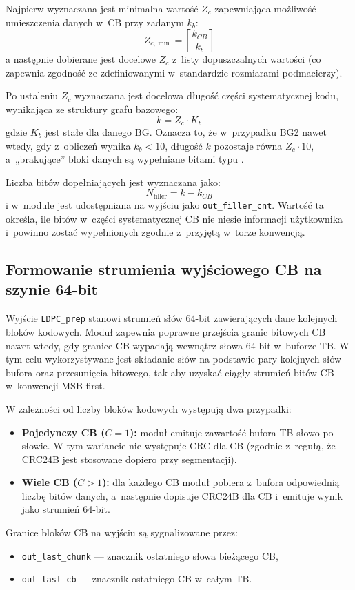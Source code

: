Najpierw wyznaczana jest minimalna wartość $Z_c$ zapewniająca możliwość umieszczenia danych w~CB przy zadanym $k_b$:
\[
Z_{c,\min} = \left\lceil \frac{k_{CB}}{k_b} \right\rceil
\]
a następnie dobierane jest docelowe $Z_c$ z~listy dopuszczalnych wartości (co zapewnia zgodność ze zdefiniowanymi w~standardzie rozmiarami podmacierzy).

Po ustaleniu $Z_c$ wyznaczana jest docelowa długość części systematycznej kodu, wynikająca ze struktury grafu bazowego:
\[
k = Z_c \cdot K_b
\]
gdzie $K_b$ jest stałe dla danego BG. Oznacza to, że w~przypadku BG2 nawet wtedy, gdy z~obliczeń wynika $k_b < 10$, długość $k$ pozostaje równa $Z_c \cdot 10$, a~„brakujące” bloki danych są wypełniane bitami typu .

Liczba bitów dopełniających jest wyznaczana jako:
\[
N_\mathrm{filler} = k - k_{CB}
\]
i w~module jest udostępniana na wyjściu jako \texttt{out\_filler\_cnt}. Wartość ta określa, ile bitów w~części systematycznej CB nie niesie informacji użytkownika i~powinno zostać wypełnionych zgodnie z~przyjętą w~torze konwencją.


\subsection{Formowanie strumienia wyjściowego CB na szynie 64-bit}
\label{subsec:ldpc_prep_streaming}

Wyjście \texttt{LDPC\_prep} stanowi strumień słów 64-bit zawierających dane kolejnych bloków kodowych. Moduł zapewnia poprawne przejścia granic bitowych CB nawet wtedy, gdy granice CB wypadają wewnątrz słowa 64-bit w~buforze TB. W tym celu wykorzystywane jest składanie słów na podstawie pary kolejnych słów bufora oraz przesunięcia bitowego, tak aby uzyskać ciągły strumień bitów CB w~konwencji MSB-first.

W zależności od liczby bloków kodowych występują dwa przypadki:
\begin{itemize}
  \item \textbf{Pojedynczy CB ($C=1$):} moduł emituje zawartość bufora TB słowo-po-słowie. W tym wariancie nie występuje CRC dla CB (zgodnie z~regułą, że CRC24B jest stosowane dopiero przy segmentacji).
  \item \textbf{Wiele CB ($C>1$):} dla każdego CB moduł pobiera z~bufora odpowiednią liczbę bitów danych, a~następnie dopisuje CRC24B dla CB i~emituje wynik jako strumień 64-bit.
\end{itemize}

Granice bloków CB na wyjściu są sygnalizowane przez:
\begin{itemize}
  \item \texttt{out\_last\_chunk} --- znacznik ostatniego słowa bieżącego CB,
  \item \texttt{out\_last\_cb} --- znacznik ostatniego CB w~całym TB.
\end{itemize}

